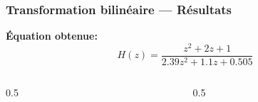 \begin{frame}
\frametitle{Transformation bilinéaire — Résultats}
\textbf{Équation obtenue:}
	\begin{equation}
		H(z) = \frac{ z^2 + 2z + 1 }{ 2.39z^2 + 1.1z + 0.505 }
	\end{equation}

	\begin{columns}

		\begin{column}{0.5\textwidth}
		\end{column}

		\begin{column}{0.5\textwidth}
		\end{column}

	\end{columns}
\end{frame}

